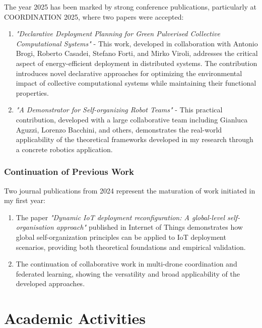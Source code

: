 \documentclass[runningheads]{llncs}
\begin{document}
The year 2025 has been marked by strong conference publications, particularly at COORDINATION 2025, where two papers were accepted:

\begin{enumerate}
\item \textit{"Declarative Deployment Planning for Green Pulverised Collective Computational Systems"} - This work, developed in collaboration with Antonio Brogi, Roberto Casadei, Stefano Forti, and Mirko Viroli, addresses the critical aspect of energy-efficient deployment in distributed systems. The contribution introduces novel declarative approaches for optimizing the environmental impact of collective computational systems while maintaining their functional properties.

\item \textit{"A Demonstrator for Self-organizing Robot Teams"} - This practical contribution, developed with a large collaborative team including Gianluca Aguzzi, Lorenzo Bacchini, and others, demonstrates the real-world applicability of the theoretical frameworks developed in my research through a concrete robotics application.
\end{enumerate}

\subsubsection{Continuation of Previous Work}

Two journal publications from 2024 represent the maturation of work initiated in my first year:

\begin{enumerate}
\item The paper \textit{"Dynamic IoT deployment reconfiguration: A global-level self-organisation approach"} published in Internet of Things demonstrates how global self-organization principles can be applied to IoT deployment scenarios, providing both theoretical foundations and empirical validation.

\item The continuation of collaborative work in multi-drone coordination and federated learning, showing the versatility and broad applicability of the developed approaches.
\end{enumerate}

\section{Academic Activities}
\end{document}
